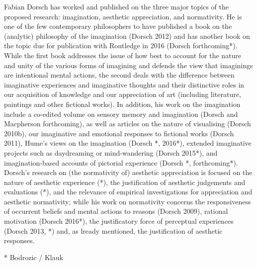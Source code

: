 \vspace{.2cm}
\noindent Fabian Dorsch has worked and published on the three major topics of the proposed research: imagination, aesthetic appreciation, and normativity. He is one of the few contemporary philosophers to have published a book on the (analytic) philosophy of the imagination (Dorsch 2012) and has another book on the topic due for publication with Routledge in 2016 (Dorsch forthcoming*). While the first book addresses the issue of how best to account for the nature and unity of the various forms of imagining and defends the view that imaginings are intentional mental actions, the second deals with the difference between imaginative experiences and imaginative thoughts and their distinctive roles in our acquisition of knowledge and our appreciation of art (including literature, paintings and other fictional works). In addition, his work on the imagination include a co-edited volume on sensory memory and imagination (Dorsch and Macpherson forthcoming), as well as articles on the nature of visualising (Dorsch 2010b), our imaginative and emotional responses to fictional works (Dorsch 2011), Hume's views on the imagination (Dorsch *, 2016*), extended imaginative projects such as daydreaming or mind-wandering (Dorsch 2015*), and imagination-based accounts of pictorial experience (Dorsch *, forthcoming*). Dorsch's research on (the normativity of) aesthetic appreciation is focused on the nature of aesthetic experience (*), the justification of aesthetic judgements and evaluations (*), and the relevance of empirical investigations for appreciation and aesthetic normativity; while his work on normativity concerns the responsiveness of occurrent beliefs and mental actions to reasons (Dorsch 2009), rational motivation (Dorsch 2016*), the justificatory force of perceptual experiences (Dorsch 2013, *) and, as lready mentioned, the justification of aesthetic responses.

* Bodrozic / Klauk